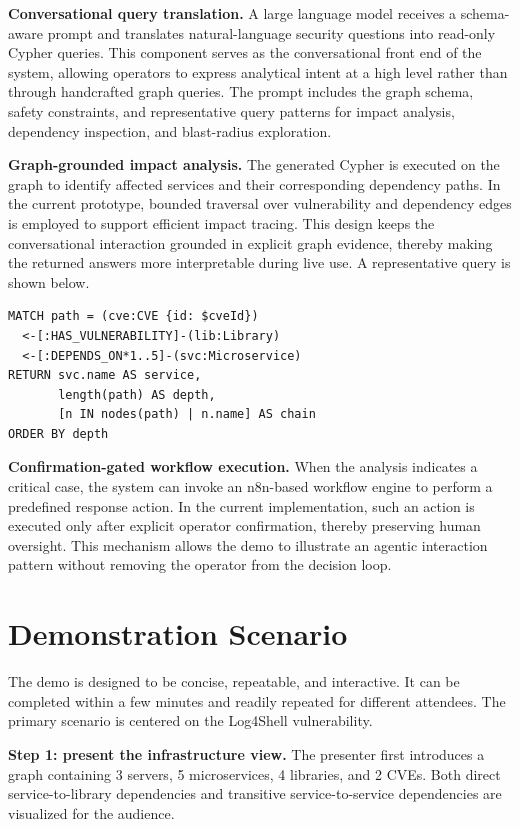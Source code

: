 \documentclass[runningheads]{llncs}
\begin{document}
\textbf{Conversational query translation.}
A large language model receives a schema-aware prompt and translates natural-language security questions into read-only Cypher queries. This component serves as the conversational front end of the system, allowing operators to express analytical intent at a high level rather than through handcrafted graph queries. The prompt includes the graph schema, safety constraints, and representative query patterns for impact analysis, dependency inspection, and blast-radius exploration.

\textbf{Graph-grounded impact analysis.}
The generated Cypher is executed on the graph to identify affected services and their corresponding dependency paths. In the current prototype, bounded traversal over vulnerability and dependency edges is employed to support efficient impact tracing. This design keeps the conversational interaction grounded in explicit graph evidence, thereby making the returned answers more interpretable during live use. A representative query is shown below.

\begin{lstlisting}
MATCH path = (cve:CVE {id: $cveId})
  <-[:HAS_VULNERABILITY]-(lib:Library)
  <-[:DEPENDS_ON*1..5]-(svc:Microservice)
RETURN svc.name AS service,
       length(path) AS depth,
       [n IN nodes(path) | n.name] AS chain
ORDER BY depth
\end{lstlisting}

\textbf{Confirmation-gated workflow execution.}
When the analysis indicates a critical case, the system can invoke an n8n-based workflow engine to perform a predefined response action. In the current implementation, such an action is executed only after explicit operator confirmation, thereby preserving human oversight. This mechanism allows the demo to illustrate an agentic interaction pattern without removing the operator from the decision loop.

\section{Demonstration Scenario}


The demo is designed to be concise, repeatable, and interactive. It can be completed within a few minutes and readily repeated for different attendees. The primary scenario is centered on the Log4Shell vulnerability.

\textbf{Step 1: present the infrastructure view.}
The presenter first introduces a graph containing 3 servers, 5 microservices, 4 libraries, and 2 CVEs. Both direct service-to-library dependencies and transitive service-to-service dependencies are visualized for the audience.
\end{document}
